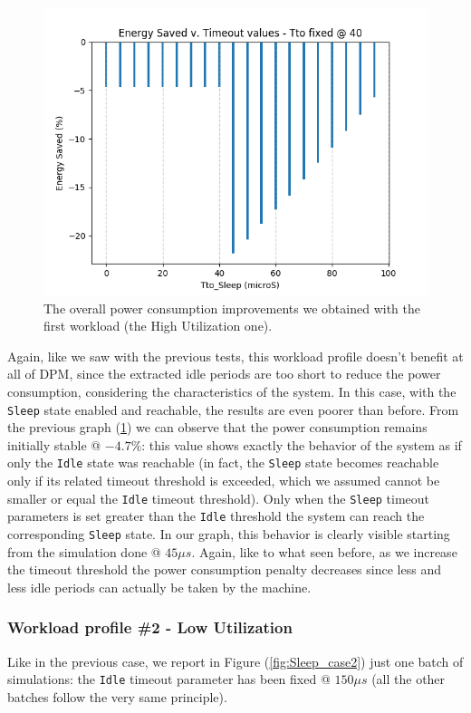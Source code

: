 \documentclass[a4paper]{article}
\begin{document}
            \begin{figure}[htp]
                \centering
                \includegraphics[width=0.5 \columnwidth]{./screenshots/Sleep_case1.png}
                \caption{
                        \label{fig:Sleep_case1}
                        The overall power consumption improvements we obtained with the first workload (the High Utilization one).
                }
            \end{figure}

            Again, like we saw with the previous tests, this workload profile doesn't benefit at all of DPM, since the extracted idle periods are too short to reduce the power consumption, considering the characteristics of the system. In this case, with the \texttt{Sleep} state enabled and reachable, the results are even poorer than before.
            From the previous graph (\ref{fig:Sleep_case1}) we can observe that the power consumption remains initially stable @ $-4.7\%$: this value shows exactly the behavior of the system as if only the \texttt{Idle} state was reachable (in fact, the \texttt{Sleep} state becomes reachable only if its related timeout threshold is exceeded, which we assumed cannot be smaller or equal the \texttt{Idle} timeout threshold).
            Only when the \texttt{Sleep} timeout parameters is set greater than the \texttt{Idle} threshold the system can reach the corresponding \texttt{Sleep} state. In our graph, this behavior is clearly visible starting from the simulation done @ $45 \mu s$.
            Again, like to what seen before, as we increase the timeout threshold the power consumption penalty decreases since less and less idle periods can actually be taken by the machine.

        \subsubsection{Workload profile \#2 - Low Utilization}
        Like in the previous case, we report in Figure (\ref{fig:Sleep_case2}) just one batch of simulations: the \texttt{Idle} timeout parameter has been fixed @ $150 \mu s$ (all the other batches follow the very same principle).
\end{document}
